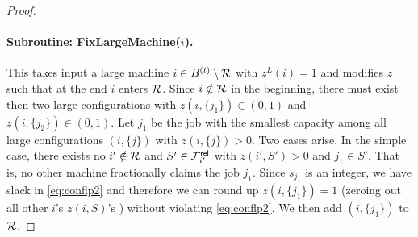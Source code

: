 \begin{proof}
%	
%	
	
%	
	
	
%	
%	
\paragraph{Subroutine: {\sf FixLargeMachine}($i$).}
This takes input a large machine $i\in B^{(t)}\setminus {\cal R}$ with  $z^L(i) = 1$ and modifies $z$ such that  at the end $i$ enters  ${\cal R}$.
Since $i\notin {\cal R}$ in the beginning, there must exist then two large configurations with $z(i,\{j_1\}) \in (0,1)$ and $z(i,\{j_2\}) \in (0,1)$. 
	Let $j_1$ be the job with the smallest capacity among all large configurations $(i,\{j\})$ with $z(i,\{j\}) > 0$.
	Two cases arise. In the simple case, there exists no $i'\notin {\cal R}$ and $S'\in {\cal F}^{\mathsf{rel}}_{i'}$ with $z(i',S') > 0$ and $j_1 \in S'$. That is, no other machine fractionally claims the job $j_1$.
	Since $s_{j_1}$ is an integer, we have slack in \eqref{eq:conflp2} and therefore we can round up $z(i,\{j_1\}) = 1$ (zeroing out all other $i$'s $z(i,S)$'s ) without violating \eqref{eq:conflp2}. We then  add $(i,\{j_1\})$ to ${\cal R}$.
	

\end{proof}
